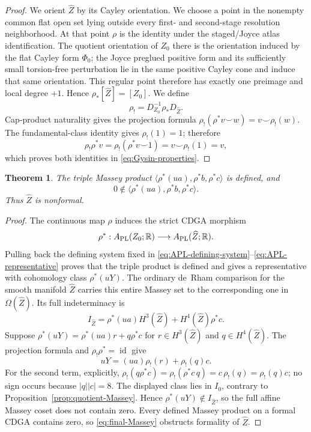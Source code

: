 \documentclass[11pt]{article}
\newtheorem{theorem}{Theorem}[section]
\theoremstyle{remark}\newtheorem{remark}[theorem]{Remark}
\newcommand{\R}{\mathbb R}
\newcommand{\id}{\operatorname{id}}
\begin{document}
\begin{proof}
We orient $\widehat Z$ by its Cayley orientation.  We choose a point in
the nonempty common flat open set lying outside every first- and second-stage
resolution neighborhood.  At that point $\rho$ is the identity under the
staged/Joyce atlas identification.  The quotient orientation of $Z_0$
there is the orientation induced by the flat Cayley form $\Phi_0$; the
Joyce preglued positive form and its sufficiently small torsion-free
perturbation lie in the same positive Cayley cone and induce that same
orientation.  This regular point therefore has exactly one preimage and
local degree $+1$.
Hence $\rho_*[\widehat Z]=[Z_0]$.  We define
\begin{equation}\label{eq:Gysin-definition}
 \rho_!=D_{Z_0}^{-1}\rho_*D_{\widehat Z}.
\end{equation}
Cap-product naturality gives the projection formula
$\rho_!(\rho^*v\smile w)=v\smile\rho_!(w)$.  The fundamental-class
identity gives $\rho_!(1)=1$; therefore
\[
 \rho_!\rho^*v=\rho_!(\rho^*v\smile1)
 =v\smile\rho_!(1)=v,
\]
which proves both identities in \eqref{eq:Gysin-properties}.
\end{proof}

\begin{theorem}\label{thm:nonformal}
The triple Massey product
$\langle\rho^*(ua),\rho^*b,\rho^*c\rangle$ is defined, and
\begin{equation}\label{eq:final-Massey}
0\notin\langle\rho^*(ua),\rho^*b,\rho^*c\rangle.
\end{equation}
Thus $\widehat Z$ is nonformal.
\end{theorem}
\begin{proof}
The continuous map $\rho$ induces the strict CDGA morphism
\[
 \rho^*:A_{\rm PL}(Z_0;\R)\longrightarrow
 A_{\rm PL}(\widehat Z;\R).
\]
Pulling back the defining system fixed in
\eqref{eq:APL-defining-system}--\eqref{eq:APL-representative} proves that
the triple product is defined and gives a representative with cohomology
class $\rho^*(uY)$.  The ordinary de~Rham comparison for the smooth
manifold $\widehat Z$ carries this entire Massey set to the corresponding
one in $\Omega(\widehat Z)$.  Its full indeterminacy is
\begin{equation}\label{eq:Ihat}
I_{\widehat Z}=\rho^*(ua)H^3(\widehat Z)+H^4(\widehat Z)\rho^*c.
\end{equation}
Suppose
$\rho^*(uY)=\rho^*(ua)r+q\rho^*c$ for
$r\in H^3(\widehat Z)$ and $q\in H^4(\widehat Z)$.  The projection formula
and $\rho_!\rho^*=\id$ give
\[
uY=(ua)\rho_!(r)+\rho_!(q)c.
\]
For the second term, explicitly,
$\rho_!(q\rho^*c)=\rho_!(\rho^*c\,q)=c\,\rho_!(q)=\rho_!(q)c$; no sign
occurs because $|q||c|=8$.  The displayed class lies in $I_0$, contrary to
Proposition~\ref{prop:quotient-Massey}.  Hence
$\rho^*(uY)\notin I_{\widehat Z}$, so the full affine Massey coset does not
contain zero.  Every defined Massey product on a formal CDGA
contains zero, so \eqref{eq:final-Massey} obstructs formality of
$\widehat Z$.
\end{proof}
\end{document}
